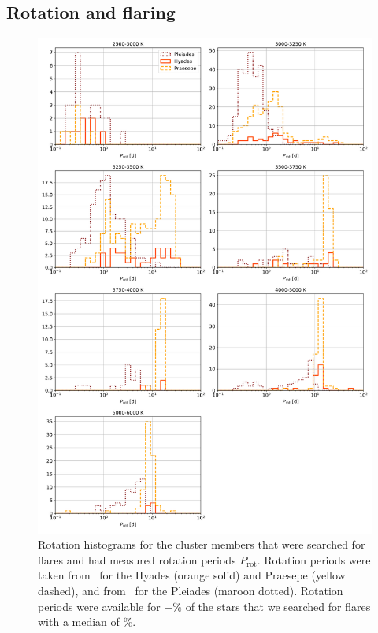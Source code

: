 \documentclass{aa}
\begin{document}
\begin{appendix}
\section{Rotation and flaring}

   \begin{figure}[ht!]
   \centering
            \includegraphics[width=16cm]{pics/rotation/SpT_wise_rotation.png}
         \caption{Rotation histograms for the cluster members that were searched for flares and had measured rotation periods $P_\mathrm{rot}$. Rotation periods were taken from~\citet{douglas2019} for the Hyades (orange solid) and Praesepe (yellow dashed), and from~\citet{rebull_pleiadesrot_2016} for the Pleiades (maroon dotted). Rotation periods were available for $-\%$ of the stars that we searched for flares with a median of $\%$.}

\end{figure}
\end{appendix}
\end{document}
